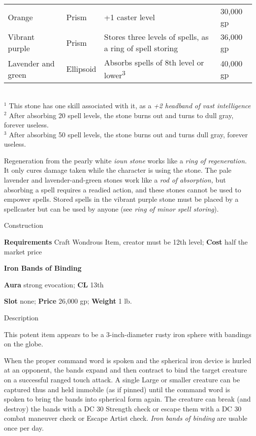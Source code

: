 \begin{figure*}[]
\begin{tabular}{llll}
Orange             & Prism          & +1 caster level                                                              & 30,000 gp             \\
Vibrant purple     & Prism          & Stores three levels of spells, as a ring of spell storing                    & 36,000 gp             \\
Lavender and green & Ellipsoid      & Absorbs spells of 8th level or lower\textsuperscript{3}                      & 40,000 gp             \\
\end{tabular}\\
\(^{1}\) This stone has one skill associated with it, as a \emph{+2 headband of vast intelligence}\\
\(^{2}\) After absorbing 20 spell levels, the stone burns out and turns to dull gray, forever useless.\\
\(^{3}\) After absorbing 50 spell levels, the stone burns out and turns dull gray, forever useless.\\
\end{figure*}

				
Regeneration from the pearly white \textit{ioun stone} works like a \textit{ring of regeneration.} It only cures damage taken while the character is using the stone. The pale lavender and lavender-and-green stones work like a \textit{rod of absorption,} but absorbing a spell requires a readied action, and these stones cannot be used to empower spells. Stored spells in the vibrant purple stone must be placed by a spellcaster but can be used by anyone (see \textit{ring of minor spell storing}). 
				
Construction
				
\textbf{Requirements} Craft Wondrous Item, creator must be 12th level;\textbf{ Cost }half the market price
				
\textbf{Iron Bands of Binding}
				
\textbf{Aura} strong evocation;\textbf{ CL }13th
				
\textbf{Slot} none; \textbf{Price} 26,000 gp; \textbf{Weight} 1 lb.
				
Description
				
This potent item appears to be a 3-inch-diameter rusty iron sphere with bandings on the globe.
				
When the proper command word is spoken and the spherical iron device is hurled at an opponent, the bands expand and then contract to bind the target creature on a successful ranged touch attack. A single Large or smaller creature can be captured thus and held immobile (as if pinned) until the command word is spoken to bring the bands into spherical form again. The creature can break (and destroy) the bands with a DC 30 Strength check or escape them with a DC 30 combat maneuver check or Escape Artist check. \textit{Iron bands of binding} are usable once per day. 
				
